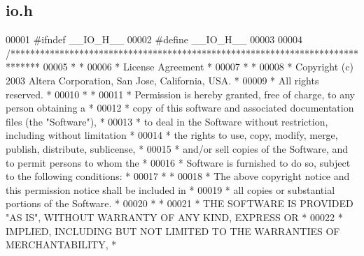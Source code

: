 \subsection{io.\+h}
\label{io_8h_source}

\begin{DoxyCode}
00001 \textcolor{preprocessor}{#ifndef \_\_IO\_H\_\_}
00002 \textcolor{preprocessor}{#define \_\_IO\_H\_\_}
00003 
00004 \textcolor{comment}{/******************************************************************************}
00005 \textcolor{comment}{*                                                                             *}
00006 \textcolor{comment}{* License Agreement                                                           *}
00007 \textcolor{comment}{*                                                                             *}
00008 \textcolor{comment}{* Copyright (c) 2003 Altera Corporation, San Jose, California, USA.           *}
00009 \textcolor{comment}{* All rights reserved.                                                        *}
00010 \textcolor{comment}{*                                                                             *}
00011 \textcolor{comment}{* Permission is hereby granted, free of charge, to any person obtaining a     *}
00012 \textcolor{comment}{* copy of this software and associated documentation files (the "Software"),  *}
00013 \textcolor{comment}{* to deal in the Software without restriction, including without limitation   *}
00014 \textcolor{comment}{* the rights to use, copy, modify, merge, publish, distribute, sublicense,    *}
00015 \textcolor{comment}{* and/or sell copies of the Software, and to permit persons to whom the       *}
00016 \textcolor{comment}{* Software is furnished to do so, subject to the following conditions:        *}
00017 \textcolor{comment}{*                                                                             *}
00018 \textcolor{comment}{* The above copyright notice and this permission notice shall be included in  *}
00019 \textcolor{comment}{* all copies or substantial portions of the Software.                         *}
00020 \textcolor{comment}{*                                                                             *}
00021 \textcolor{comment}{* THE SOFTWARE IS PROVIDED "AS IS", WITHOUT WARRANTY OF ANY KIND, EXPRESS OR  *}
00022 \textcolor{comment}{* IMPLIED, INCLUDING BUT NOT LIMITED TO THE WARRANTIES OF MERCHANTABILITY,    *}

\end{DoxyCode}
